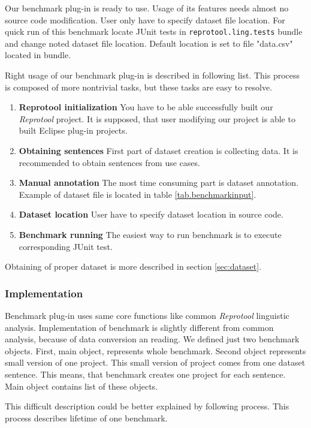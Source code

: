 Our benchmark plug-in is ready to use. Usage of its features needs almost no source code modification. User only have to specify dataset file location. For quick run of this benchmark locate JUnit tests in {\tt reprotool.ling.tests} bundle and change noted dataset file location. Default location is set to file "data.csv" located in bundle.

Right usage of our benchmark plug-in is described in following list. This process is composed of more nontrivial tasks, but these tasks are easy to resolve.

\begin{enumerate}
\item {\bf Reprotool initialization} You have to be able successfully built our \emph{Reprotool} project. It is supposed, that user modifying our project is able to built Eclipse plug-in projects.
\item {\bf Obtaining sentences} First part of dataset creation is collecting data. It is recommended to obtain sentences from use cases.
\item {\bf Manual annotation} The most time consuming part is dataset annotation. Example of dataset file is located in table \ref{tab.benchmarkinput}.
\item {\bf Dataset location} User have to specify dataset location in source code.
\item {\bf Benchmark running} The easiest way to run benchmark is to execute corresponding JUnit test.
\end{enumerate}

Obtaining of proper dataset is more described in section \ref{sec:dataset}. 

\subsubsection{Implementation}
Benchmark plug-in uses same core functions like common \emph{Reprotool} linguistic analysis. Implementation of benchmark is slightly different from common analysis, because of data conversion an reading. We defined just two benchmark objects. First, main object, represents whole benchmark. Second object represents small version of one project. This small version of project comes from one dataset sentence. This means, that benchmark creates one project for each sentence. Main object contains list of these objects.

This difficult description could be better explained by following process. This process describes lifetime of one benchmark.

